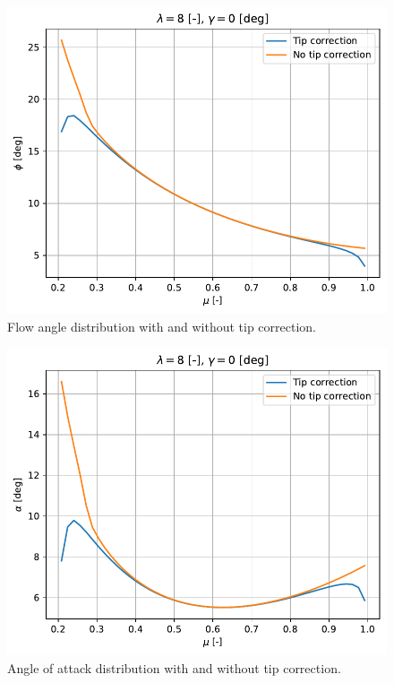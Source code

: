 \begin{figure}[htbp]
	\centering
	\includegraphics[height=0.45\textheight]{./img/tip-correction/phi.pdf}
	\caption{Flow angle distribution with and without tip correction.}
	\label{img:tc-phi}
\end{figure}

\begin{figure}[htbp]
	\centering
	\includegraphics[height=0.45\textheight]{./img/tip-correction/alpha.pdf}
	\caption{Angle of attack distribution with and without tip correction.}
	\label{img:tc-alpha}
\end{figure}

